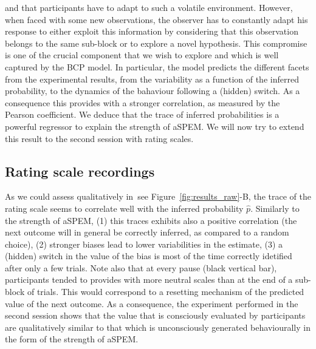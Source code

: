 \documentclass[profile,final,english, draft]{article}%
\newcommand{\seeFig}[1]{see Figure~\ref{fig:#1}}
\begin{document}
and that participants have to adapt to such a volatile environment.
However, when faced with some new observations,
the observer has to constantly adapt his response
to either exploit this information by considering that
this observation belongs to the same sub-block or to explore
a novel hypothesis.
This compromise is one of the crucial component that we wish to explore
and which is well captured by the BCP model.
In particular, the model predicts the different facets
from the experimental results,
from the variability as a function of the inferred probability,
to the dynamics of the bahaviour following a (hidden) switch.
As a consequence this provides with a stronger correlation,
as measured by the Pearson coefficient.
We deduce that the trace of inferred probabilities is a powerful regressor
to explain the strength of aSPEM.
We will now try to extend this result
to the second session with rating scales.
\subsection{Rating scale recordings}
As we could assess qualitatively in~\seeFig{results_raw}-B,
the trace of the rating scale seems to correlate well
with the inferred probability $\hat{p}$.
Similarly to the strength of aSPEM,
(1) this traces exhibits also a positive correlation
(the next outcome will in general be correctly inferred,
as compared to a random choice),
(2) stronger biases lead to lower variabilities in the estimate,
(3) a (hidden) switch in the value of the bias is
most of the time correctly idetified after only a few trials.
Note also that at every pause (black vertical bar),
participants tended to provides with more neutral scales
than at the end of a sub-block of trials.
This would correspond to a resetting mechanism
of the predicted value of the next outcome.
As a consequence, the experiment performed in the second session
shows that the value that is consciously evaluated by participants
are qualitatively similar to that which is unconsciously generated behaviourally
in the form of the strength of aSPEM.
\end{document}
